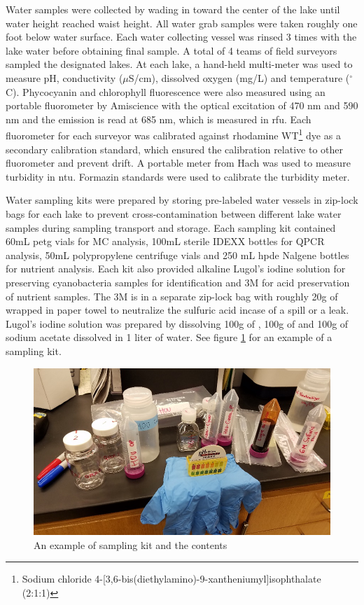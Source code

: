 Water samples were collected by wading in toward the center of the lake until water height reached waist height. All water grab samples were taken roughly one foot below water surface. Each water collecting vessel was rinsed 3 times with the lake water before obtaining final sample. A total of 4 teams of field surveyors sampled the designated lakes. At each lake, a hand-held multi-meter was used to measure pH, conductivity ($\mu$S/cm), dissolved oxygen (mg/L) and temperature ($^\circ$C). Phycocyanin and chlorophyll fluorescence were also measured using an portable fluorometer by Amiscience with the optical excitation of 470 nm and 590 nm and the emission is read at 685 nm, which is measured in \gls{rfu}. Each fluorometer for each surveyor was calibrated against rhodamine WT\footnote{Sodium chloride 4-[3,6-bis(diethylamino)-9-xantheniumyl]isophthalate (2:1:1)} dye as a secondary calibration standard, which ensured the calibration relative to other fluorometer and prevent drift. A portable meter from Hach was used to measure turbidity in \gls{ntu}. Formazin standards were used to calibrate the turbidity meter.

Water sampling kits were prepared by storing pre-labeled water vessels in zip-lock bags for each lake to prevent cross-contamination between different lake water samples during sampling transport and storage. Each sampling kit contained 60mL \gls{petg} vials for MC analysis, 100mL sterile IDEXX bottles for QPCR analysis, 50mL polypropylene centrifuge vials and 250 mL \gls{hpde} Nalgene bottles for nutrient analysis. Each kit also provided alkaline Lugol's iodine solution for preserving cyanobacteria samples for identification and 3M  for acid preservation of nutrient samples. The 3M  is in a separate zip-lock bag with roughly 20g of  wrapped in paper towel to neutralize the sulfuric acid incase of a spill or a leak. Lugol's iodine solution was prepared by dissolving 100g of , 100g of  and 100g of sodium acetate dissolved in 1 liter of water. See figure \ref{fig:samplekit} for an example of a sampling kit.

\begin{figure}[!h]
\includegraphics[width=\textwidth]{figures/samplekit}
\caption{An example of sampling kit and the contents}
\label{fig:samplekit}
\end{figure}


